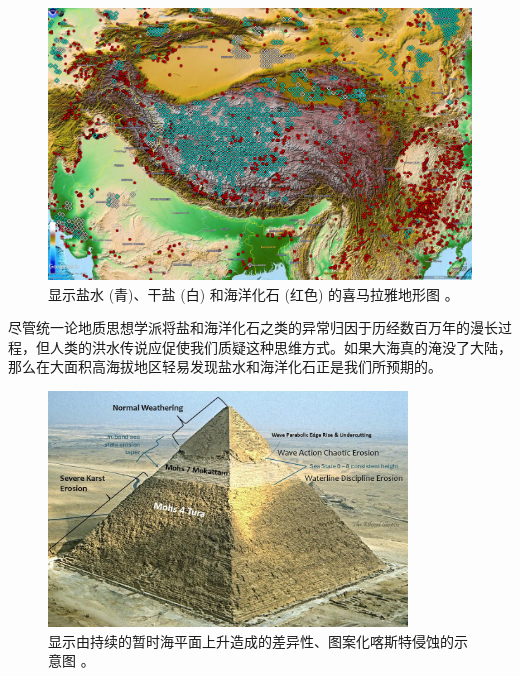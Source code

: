 \documentclass[10pt,twocolumn,letterpaper]{article}
\begin{document}
\begin{figure}[t]
\begin{center}
   \includegraphics[width=1\linewidth]{tibet.jpg}
\end{center}
   \caption{显示盐水 (青)、干盐 (白) 和海洋化石 (红色) 的喜马拉雅地形图 \cite{15,16,86,87}。}
\label{fig:3}
\label{fig:onecol}
\end{figure}

尽管统一论地质思想学派将盐和海洋化石之类的异常归因于历经数百万年的漫长过程，但人类的洪水传说应促使我们质疑这种思维方式。如果大海真的淹没了大陆，那么在大面积高海拔地区轻易发现盐水和海洋化石正是我们所预期的。

\begin{figure}[t]
\begin{center}
\includegraphics[width=0.85\textwidth]{khafre.jpg}
\end{center}
   \caption{显示由持续的暂时海平面上升造成的差异性、图案化喀斯特侵蚀的示意图 \cite{27}。}
\label{fig:4}
\end{figure}
\end{document}
